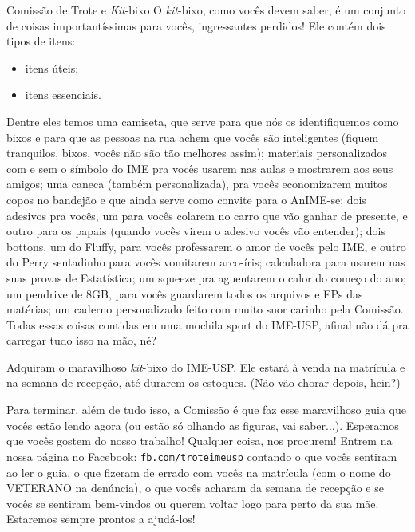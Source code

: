 \begin{secao}{Comissão de Trote e \textit{Kit}-bixo}
O \textit{kit}-bixo, como vocês devem saber, é um conjunto de coisas
importantíssimas para vocês, ingressantes perdidos! Ele contém dois tipos de
itens:
\begin{itemize}
\item itens úteis;
\item itens essenciais.
\end{itemize} %
Dentre eles temos uma camiseta, que serve para que nós os identifiquemos como
bixos e para que as pessoas na rua achem que vocês são inteligentes (fiquem
tranquilos, bixos, vocês não são tão melhores assim); materiais personalizados
com e sem o símbolo do IME pra vocês usarem nas aulas e mostrarem aos seus amigos; uma
caneca (também personalizada), pra vocês economizarem muitos copos no bandejão e
que ainda serve como convite para o AnIME-se; dois adesivos pra vocês, um para
vocês colarem no carro que vão ganhar de presente, e outro para os papais
(quando vocês virem o adesivo vocês vão entender); dois bottons, um do Fluffy, para vocês professarem o amor de vocês pelo IME, e outro do Perry sentadinho para vocês vomitarem arco-íris; calculadora para usarem nas
suas provas de Estatística; um squeeze pra aguentarem o calor do começo do ano;
um pendrive de 8GB, para vocês guardarem todos os arquivos e EPs das matérias;
um caderno personalizado feito com muito \sout{suor} carinho pela Comissão.
Todas essas coisas contidas em uma mochila sport do IME-USP, afinal não dá pra
carregar tudo isso na mão, né?

Adquiram o maravilhoso \textit{kit}-bixo do IME-USP. Ele estará à venda na
matrícula e na semana de recepção, até durarem os estoques. (Não vão chorar
depois, hein?)

Para terminar, além de tudo isso, a Comissão é que faz esse maravilhoso guia que
vocês estão lendo agora (ou estão só olhando as figuras, vai
saber...). Esperamos que vocês gostem do nosso trabalho! Qualquer coisa, nos
procurem! Entrem na nossa página no Facebook: {\tt fb.com/troteimeusp} contando
o que vocês sentiram ao ler o guia, o que fizeram de errado com vocês na
matrícula (com o nome do VETERANO na denúncia), o que vocês acharam da semana
de recepção e se vocês se sentiram bem-vindos ou querem voltar logo para perto
da sua mãe. Estaremos sempre prontos a ajudá-los!
\end{secao}

